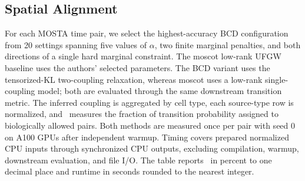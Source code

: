 \subsection{Spatial Alignment}
For each MOSTA time pair, we select the highest-accuracy BCD configuration from 20 settings spanning five values of $\alpha$, two finite marginal penalties, and both directions of a single hard marginal constraint.
The moscot low-rank UFGW baseline uses the authors' selected parameters.
The BCD variant uses the tensorized-KL two-coupling relaxation, whereas moscot uses a low-rank single-coupling model; both are evaluated through the same downstream transition metric.
The inferred coupling is aggregated by cell type, each source-type row is normalized, and \transitionacc\ measures the fraction of transition probability assigned to biologically allowed pairs.
Both methods are measured once per pair with seed 0 on A100 GPUs after independent warmup.
Timing covers prepared normalized CPU inputs through synchronized CPU outputs, excluding compilation, warmup, downstream evaluation, and file I/O.
The table reports \transitionacc\ in percent to one decimal place and runtime in seconds rounded to the nearest integer.
